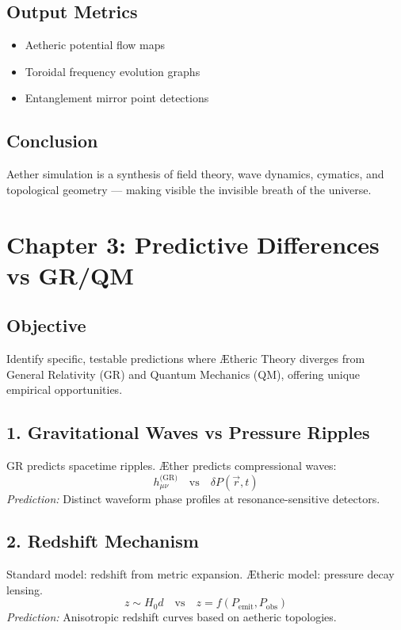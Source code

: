 \documentclass[12pt]{book}
\begin{document}
\subsection*{Output Metrics}
\begin{itemize}
  \item Aetheric potential flow maps
  \item Toroidal frequency evolution graphs
  \item Entanglement mirror point detections
\end{itemize}

\subsection*{Conclusion}
Aether simulation is a synthesis of field theory, wave dynamics, cymatics, and topological geometry — making visible the invisible breath of the universe.




\section*{Chapter 3: Predictive Differences vs GR/QM}

\subsection*{Objective}
Identify specific, testable predictions where Ætheric Theory diverges from General Relativity (GR) and Quantum Mechanics (QM), offering unique empirical opportunities.

\subsection*{1. Gravitational Waves vs Pressure Ripples}
GR predicts spacetime ripples. Æther predicts compressional waves:
\[
h_{\mu\nu}^{\text{(GR)}} \quad \text{vs} \quad \delta P(\vec{r}, t)
\]
\textit{Prediction:} Distinct waveform phase profiles at resonance-sensitive detectors.

\subsection*{2. Redshift Mechanism}
Standard model: redshift from metric expansion.
Ætheric model: pressure decay lensing.
\[
z \sim H_0 d \quad \text{vs} \quad z = f(P_{\text{emit}}, P_{\text{obs}})
\]
\textit{Prediction:} Anisotropic redshift curves based on aetheric topologies.
\end{document}
